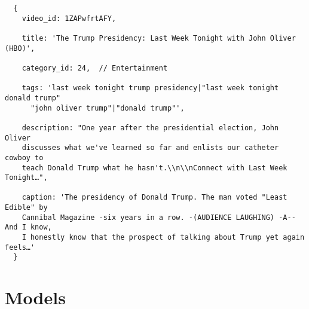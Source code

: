 \documentclass[letterpaper, 12pt]{article}
\begin{document}
\begin{Verbatim}
  {
    video_id: 1ZAPwfrtAFY,

    title: 'The Trump Presidency: Last Week Tonight with John Oliver (HBO)',

    category_id: 24,  // Entertainment

    tags: 'last week tonight trump presidency|"last week tonight donald trump"
      "john oliver trump"|"donald trump"',

    description: "One year after the presidential election, John Oliver
    discusses what we've learned so far and enlists our catheter cowboy to
    teach Donald Trump what he hasn't.\\n\\nConnect with Last Week Tonight…",

    caption: 'The presidency of Donald Trump. The man voted "Least Edible" by
    Cannibal Magazine -six years in a row. -(AUDIENCE LAUGHING) -A-- And I know,
    I honestly know that the prospect of talking about Trump yet again feels…'
  }
\end{Verbatim}

\section{Models}
\end{document}
